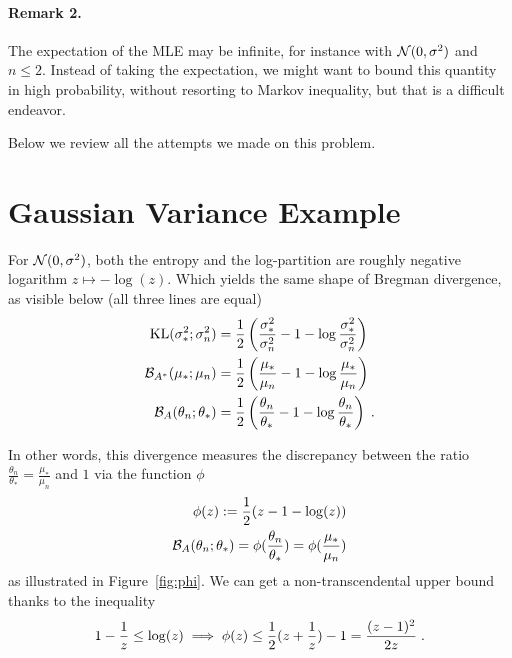 \documentclass{article}
\newcommand{\logpart}{A}
\newcommand{\bregman}{\cB_\logpart}
\newcommand{\bregmanconj}{\cB_{\logpart^*}}
\newcommand{\natp}{\theta}
\begin{document}
\paragraph{Remark 2.}
The expectation of the MLE may be infinite, for instance with ${\mathcal N}(0,\sigma^2)$ and $n\leq 2$. Instead of taking the expectation,  we might want to bound this quantity in high probability, without resorting to Markov inequality, but that is a difficult endeavor.

Below we review all the attempts we made on this problem.

\tableofcontents

\section{Gaussian Variance Example}

\begin{example}
	For ${\mathcal N}(0,\sigma^2)$, both the entropy and the log-partition are roughly negative logarithm $z\mapsto - \log(z)$. Which yields the same shape of Bregman divergence, as visible below (all three lines are equal)
\begin{align}
	\KL( \sigma_*^2 ; \sigma_n^2 ) 
	&= \half \left ( \frac{\sigma_*^2}{ \sigma_n^2} - 1 - \log \frac{\sigma_*^2}{ \sigma_n^2} \right) \\
	\bregmanconj( \mu_*; \mu_n) 
	&= \half \left ( \frac{\mu_*}{ \mu_n} - 1 - \log  \frac{\mu_*}{ \mu_n} \right) \\
	\bregman( \natp_n; \natp_* ) 
	&=  \half \left ( \frac{ \natp_n}{\natp_*} - 1 - \log  \frac{ \natp_n}{\natp_*} \right) \; .
\end{align}
\end{example}
In other words, this divergence measures the discrepancy between the ratio $\frac{ \natp_n}{\natp_*} =  \frac{\mu_*}{ \mu_n}  $ and $1$ via the function $\phi$
\begin{align}
	\phi(z) := \half (z - 1 - \log(z)) \\
	\bregman( \natp_n; \natp_* )   = \phi(\frac{ \natp_n}{\natp_*}) =  \phi(\frac{\mu_*}{ \mu_n})
\end{align}
as illustrated in Figure~\ref{fig:phi}. We can get a non-transcendental upper bound thanks to the inequality
\begin{align}
	1 - \frac{1}{z} \leq \log(z) 
	\label{eq:log_bound} 
	\implies \phi(z) \leq \frac{1}{2} (z + \frac{1}{z}) - 1 = \frac{(z-1)^2}{2 z} \; .
\end{align}
\end{document}
